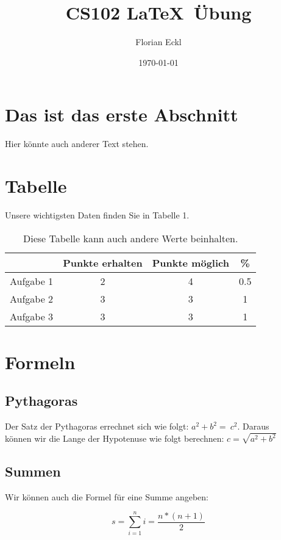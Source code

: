 \documentclass[11pt]{article}
\title{CS102 \LaTeX ~\"Ubung}
\author{Florian Eckl}
\date{\today}
\begin{document}
\maketitle

\section{Das ist das erste Abschnitt}

Hier k\"onnte auch anderer Text stehen.

\section{Tabelle}

Unsere wichtigsten Daten finden Sie in Tabelle 1.

\begin{table}[!th]

\centering

\begin{tabular}{c|c|c|c}

& Punkte erhalten & Punkte m\"oglich & \% \\

\hline

Aufgabe 1 & 2 & 4 & 0.5 \\

Aufgabe 2 & 3 & 3 & 1 \\

Aufgabe 3 & 3 & 3 & 1 \\

\end{tabular}

\caption{Diese Tabelle kann auch andere Werte beinhalten.}

\label{table:diese Tabelle kann auch andere Werte beinhalten.}

\end{table}

\section{Formeln}

\subsection{Pythagoras}

Der Satz der Pythagoras errechnet sich wie folgt: $a^{2} + b^{2} =\ c^{2}$. Daraus\\ 
k\"onnen wir die Lange der Hypotenuse wie folgt berechnen: $c =\sqrt{a^{2} + b^{2}}$ 

\subsection{Summen}

Wir k\"onnen auch die Formel f\"ur eine Summe angeben:

\begin{equation}
s = \sum_{i=1}^n i = \frac{n*(n+1)}{2}
\end{equation}
\end{document}
